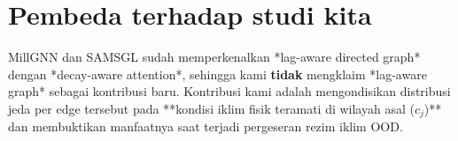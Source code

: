 \documentclass[11pt,a4paper]{article}
\begin{document}
\section{Pembeda terhadap studi kita}
MillGNN dan SAMSGL sudah memperkenalkan *lag-aware directed graph* dengan *decay-aware attention*, sehingga kami \textbf{tidak} mengklaim *lag-aware graph* sebagai kontribusi baru. Kontribusi kami adalah mengondisikan distribusi jeda per edge tersebut pada **kondisi iklim fisik teramati di wilayah asal ($c_j$)** dan membuktikan manfaatnya saat terjadi pergeseran rezim iklim OOD.
\end{document}
